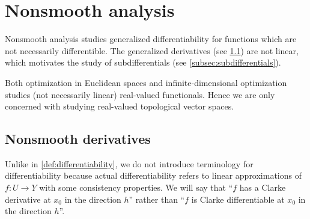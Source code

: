 \section{Nonsmooth analysis}\label{sec:nonsmooth_analysis}

\begin{remark}\label{remark:nonsmooth_analysis}
  Nonsmooth analysis studies generalized differentiability for functions which are not necessarily differentible. The generalized derivatives (see \cref{subsec:nonsmooth_derivatives}) are not linear, which motivates the study of subdifferentials (see \cref{subsec:subdifferentials}).

  Both optimization in Euclidean spaces and infinite-dimensional optimization studies (not necessarily linear) real-valued functionals. Hence we are only concerned with studying real-valued topological vector spaces.
\end{remark}

\subsection{Nonsmooth derivatives}\label{subsec:nonsmooth_derivatives}

\begin{remark}\label{remark:nonsmooth_differentiability}
  Unlike in \cref{def:differentiability}, we do not introduce terminology for differentiability because actual differentiability refers to linear approximations of \( f: U \to Y \) with some consistency properties. We will say that \enquote{\( f \) has a Clarke derivative at \( x_0 \) in the direction \( h \)} rather than \enquote{\( f \) is Clarke differentiable at \( x_0 \) in the direction \( h \)}.
\end{remark}

